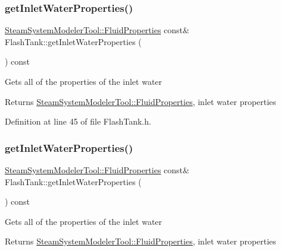 \subsubsection{\texorpdfstring{get\+Inlet\+Water\+Properties()}{getInletWaterProperties()}\hspace{0.1cm}{\footnotesize\ttfamily [2/3]}}
{\footnotesize\ttfamily \hyperlink{struct_steam_system_modeler_tool_1_1_fluid_properties}{Steam\+System\+Modeler\+Tool\+::\+Fluid\+Properties} const\& Flash\+Tank\+::get\+Inlet\+Water\+Properties (\begin{DoxyParamCaption}{ }\end{DoxyParamCaption}) const\hspace{0.3cm}{\ttfamily [inline]}}

Gets all of the properties of the inlet water \begin{DoxyReturn}{Returns}
\hyperlink{struct_steam_system_modeler_tool_1_1_fluid_properties}{Steam\+System\+Modeler\+Tool\+::\+Fluid\+Properties}, inlet water properties 
\end{DoxyReturn}


Definition at line 45 of file Flash\+Tank.\+h.

\mbox{\label{class_flash_tank_a582b3e730f1619891533965940d692de}} 
\subsubsection{\texorpdfstring{get\+Inlet\+Water\+Properties()}{getInletWaterProperties()}\hspace{0.1cm}{\footnotesize\ttfamily [3/3]}}
{\footnotesize\ttfamily \hyperlink{struct_steam_system_modeler_tool_1_1_fluid_properties}{Steam\+System\+Modeler\+Tool\+::\+Fluid\+Properties} const\& Flash\+Tank\+::get\+Inlet\+Water\+Properties (\begin{DoxyParamCaption}{ }\end{DoxyParamCaption}) const\hspace{0.3cm}{\ttfamily [inline]}}

Gets all of the properties of the inlet water \begin{DoxyReturn}{Returns}
\hyperlink{struct_steam_system_modeler_tool_1_1_fluid_properties}{Steam\+System\+Modeler\+Tool\+::\+Fluid\+Properties}, inlet water properties 
\end{DoxyReturn}


